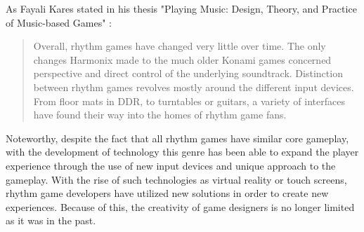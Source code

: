 As Fayali Kares stated in his thesis "Playing Music: Design, Theory, and Practice of Music-based Games" \cite{fayeskayali}: 
\begin{quote}
    \singlespacing
    Overall, rhythm games have changed very little over time. The only changes Harmonix made to the much older Konami games concerned perspective and direct control of the underlying soundtrack. Distinction between rhythm games revolves mostly around the different input devices. From floor mats in DDR, to turntables or guitars, a variety of interfaces have found their way into the homes of rhythm game fans.
    \singlespacing
\end{quote}

Noteworthy, despite the fact that all rhythm games have similar core gameplay, with the development of technology this genre has been able to expand the player experience through the use of new input devices and unique approach to the gameplay. With the rise of such technologies as virtual reality or touch screens, rhythm game developers have utilized new solutions in order to create new experiences. Because of this, the creativity of game designers is no longer limited as it was in the past.